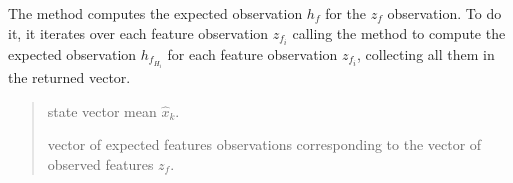\documentclass[letterpaper,10pt,english]{sphinxmanual}
\begin{document}
\begin{fulllineitems}
\begin{fulllineitems}
\sphinxAtStartPar
The method computes the expected observation \(h_{f}\) for the \(z_{f}\) observation.
To do it, it iterates over each feature observation \(z_{f_i}\) calling the method {\hyperref[\detokenize{FEKFMBLocalization:MapFeature.MapFeature.hfj}]{}}
to compute the expected observation \(h_{f_{H_i}}\) for each feature observation \(z_{f_i}\), collecting all them in the returned vector.
\begin{quote}\begin{description}
\sphinxAtStartPar
{} \textendash{} state vector mean \(\hat x_k\).

\sphinxAtStartPar
vector of expected features observations corresponding to the vector of observed features \(z_f\).

\end{description}\end{quote}

\end{fulllineitems}



\end{fulllineitems}
\end{document}
